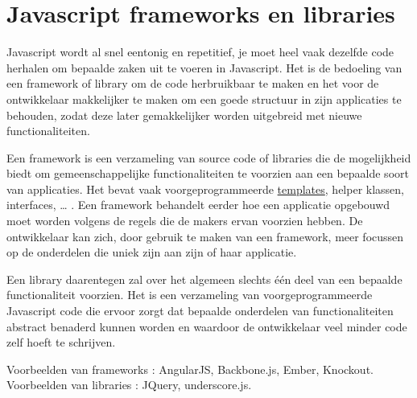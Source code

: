 \section{Javascript frameworks en libraries} \label{section:frameworkslibraries}

Javascript wordt al snel eentonig en repetitief, je moet heel vaak dezelfde code herhalen om bepaalde zaken uit te voeren in Javascript. Het is de bedoeling van een framework of library om de code herbruikbaar te maken en het voor de ontwikkelaar makkelijker te maken om een goede structuur in zijn applicaties te behouden, zodat deze later gemakkelijker worden uitgebreid met nieuwe functionaliteiten.
 
Een framework is een verzameling van source code of libraries die de mogelijkheid biedt om gemeenschappelijke functionaliteiten te voorzien aan een bepaalde soort van applicaties. Het bevat vaak voorgeprogrammeerde \hyperref[template]{templates}, helper klassen, interfaces, … . Een framework behandelt eerder hoe een applicatie opgebouwd moet worden volgens de regels die de makers ervan voorzien hebben. De ontwikkelaar kan zich, door gebruik te maken van een framework, meer focussen op de onderdelen die uniek zijn aan zijn of haar applicatie.

Een library daarentegen zal over het algemeen slechts één deel van een bepaalde functionaliteit voorzien. Het is een verzameling van voorgeprogrammeerde Javascript code die ervoor zorgt dat bepaalde onderdelen van functionaliteiten abstract benaderd kunnen worden en waardoor de ontwikkelaar veel minder code zelf hoeft te schrijven. \citep{docforge:Javascript}

Voorbeelden van frameworks : AngularJS, Backbone.js, Ember, Knockout.
Voorbeelden van libraries : JQuery, underscore.js.

